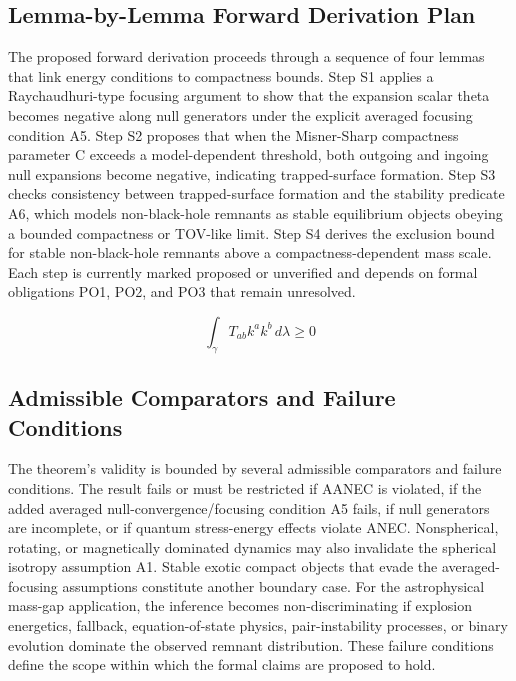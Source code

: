 \documentclass[conference]{IEEEtran}
\begin{document}
\subsection{Lemma-by-Lemma Forward Derivation Plan}
The proposed forward derivation proceeds through a sequence of four lemmas that link energy conditions to compactness bounds. Step S1 applies a Raychaudhuri-type focusing argument to show that the expansion scalar theta becomes negative along null generators under the explicit averaged focusing condition A5. Step S2 proposes that when the Misner-Sharp compactness parameter C exceeds a model-dependent threshold, both outgoing and ingoing null expansions become negative, indicating trapped-surface formation. Step S3 checks consistency between trapped-surface formation and the stability predicate A6, which models non-black-hole remnants as stable equilibrium objects obeying a bounded compactness or TOV-like limit. Step S4 derives the exclusion bound for stable non-black-hole remnants above a compactness-dependent mass scale. Each step is currently marked proposed or unverified and depends on formal obligations PO1, PO2, and PO3 that remain unresolved.

\[
\int_{\gamma} T_{ab} k^a k^b \, d\lambda \geq 0
\]

\subsection{Admissible Comparators and Failure Conditions}
The theorem's validity is bounded by several admissible comparators and failure conditions. The result fails or must be restricted if AANEC is violated, if the added averaged null-convergence/focusing condition A5 fails, if null generators are incomplete, or if quantum stress-energy effects violate ANEC. Nonspherical, rotating, or magnetically dominated dynamics may also invalidate the spherical isotropy assumption A1. Stable exotic compact objects that evade the averaged-focusing assumptions constitute another boundary case. For the astrophysical mass-gap application, the inference becomes non-discriminating if explosion energetics, fallback, equation-of-state physics, pair-instability processes, or binary evolution dominate the observed remnant distribution. These failure conditions define the scope within which the formal claims are proposed to hold.
\end{document}
